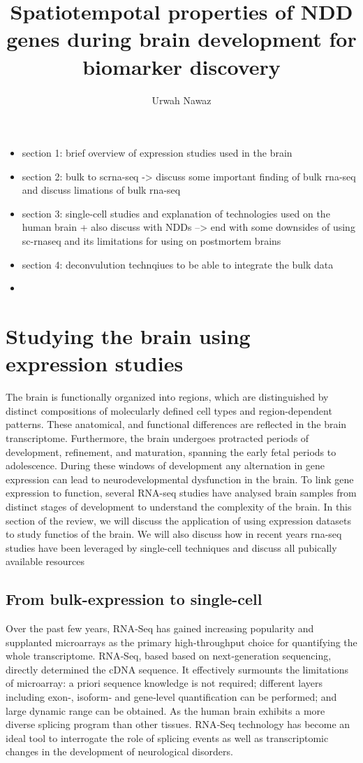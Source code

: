 \documentclass[12pt]{article}
\title{Spatiotempotal properties of NDD genes during brain development for biomarker discovery}
\author{Urwah Nawaz}
\begin{document}
	\maketitle


\begin{itemize}
	\item section 1: brief overview of expression studies used in the brain 
	\item section 2: bulk to scrna-seq -> discuss some important finding of bulk rna-seq and discuss limations of bulk rna-seq
	\item section 3: single-cell studies and explanation of technologies used on the human brain + also discuss with NDDs --> end with some downsides of using sc-rnaseq and its limitations for using on postmortem brains
	\item section 4: deconvulution technqiues to be able to integrate the bulk data 
	\item 
\end{itemize}
\section{Studying the brain using expression studies}
The brain is functionally organized into regions, which are distinguished by distinct compositions of molecularly defined cell types and region-dependent patterns. These anatomical, and functional differences are reflected in the brain transcriptome. 
Furthermore, the brain undergoes protracted periods of development, refinement, and maturation, spanning the early fetal periods to adolescence.
During these windows of development any alternation in gene expression can lead to neurodevelopmental dysfunction in the brain. 
To link gene expression to function, several RNA-seq studies have analysed brain samples from distinct stages of development to understand the complexity of the brain. In this section of the review, we will discuss the application of using expression datasets to study functios of the brain. 
We will also discuss how in recent years rna-seq studies have been leveraged by single-cell techniques and discuss all pubically available resources

\subsection{From bulk-expression to single-cell}
Over the past few years, RNA‐Seq has gained increasing popularity and supplanted microarrays as the primary high‐throughput choice for quantifying the whole transcriptome.
RNA‐Seq, based based on next‐generation sequencing, directly determined the cDNA sequence. It effectively surmounts the limitations of microarray: a priori sequence knowledge is not required; different layers including exon‐, isoform‐ and gene‐level quantification can be performed; and large dynamic range can be obtained. As the human brain exhibits a more diverse splicing program than other tissues.  RNA‐Seq technology has become an ideal tool to interrogate the role of splicing events as well as transcriptomic changes in the development of neurological disorders.
\end{document}
